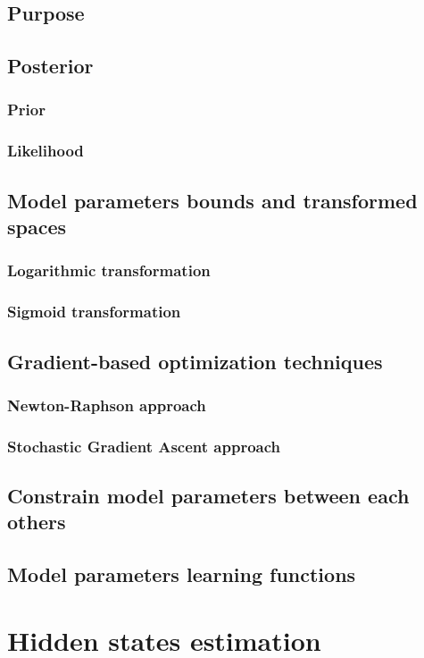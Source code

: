 \documentclass{book}
\begin{document}
\section{Purpose}
\section{Posterior}
\subsection{Prior}
\subsection{Likelihood}
\section{Model parameters bounds and transformed spaces}
\subsection{Logarithmic transformation}
\subsection{Sigmoid transformation}
\section{Gradient-based optimization techniques}
\subsection{Newton-Raphson approach}
\subsection{Stochastic Gradient Ascent approach}
\section{Constrain model parameters between each others}
\section{Model parameters learning functions}
\newpage

\chapter{Hidden states estimation}
\end{document}
